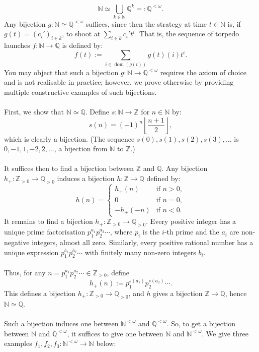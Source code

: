 \documentclass[11pt, a4paper, oneside]{article}
\theoremstyle{remark}
\theoremstyle{lemma}
\begin{document}
\[
\mathbb{N} \simeq \bigcup_{k \in \mathbb{N}} \mathbb{Q}^k =: \mathbb{Q}^{<\omega}.
\]
Any bijection \(g: \mathbb{N} \simeq \mathbb{Q}^{<\omega}\) suffices, since then the strategy at time \(t \in \mathbb{N}\) is, if \(g(t) = (c_i')_{i \in k}\), to shoot at \(\sum_{i \in k} c_i' t^{i}\). That is, the sequence of torpedo launches \(f: \mathbb{N} \rightarrow \mathbb{Q}\) is defined by:
\[
f(t) := \sum_{i \in \operatorname{dom}(g(t))} g(t)(i) t^{i}.
\]
You may object that such a bijection \(g: \mathbb{N} \rightarrow \mathbb{Q}^{<\omega}\) requires the axiom of choice and is not realisable in practice; however, we prove otherwise by providing multiple constructive examples of such bijections.
\\\\
First, we show that \(\mathbb{N} \simeq \mathbb{Q}\). Define \(s: \mathbb{N} \to \mathbb{Z}\) for \(n \in \mathbb{N}\) by:
\[
s(n) = (-1)^n \left\lfloor \frac{n + 1}{2} \right\rfloor,
\]
which is clearly a bijection. (The sequence \(s(0), s(1), s(2), s(3), \ldots\) is \(0, -1, 1, -2, 2, \ldots\), a bijection from \(\mathbb{N}\) to \(\mathbb{Z}\).)
\\\\
It suffices then to find a bijection between \(\mathbb{Z}\) and \(\mathbb{Q}\). Any bijection \(h_+: \mathbb{Z}_{>0} \to \mathbb{Q}_{>0}\) induces a bijection \(h: \mathbb{Z} \to \mathbb{Q}\) defined by:
\[
h(n) =
\begin{cases}
h_+(n) & \text{if } n > 0, \\
0 & \text{if } n = 0, \\
-h_+(-n) & \text{if } n < 0.
\end{cases}
\]
It remains to find a bijection \(h_+: \mathbb{Z}_{>0} \to \mathbb{Q}_{>0}\). Every positive integer has a unique prime factorisation \(p_1^{a_1} p_2^{a_2} \cdots\), where \(p_i\) is the \(i\)-th prime and the \(a_i\) are non-negative integers, almost all zero. Similarly, every positive rational number has a unique expression \(p_1^{b_1} p_2^{b_2} \cdots\) with finitely many non-zero integers \(b_i\).
\\\\
Thus, for any \(n = p_1^{a_1} p_2^{a_2} \cdots \in \mathbb{Z}_{>0}\), define
\[
h_+(n) := p_1^{s(a_1)} p_2^{s(a_2)} \cdots.
\]
This defines a bijection \(h_+: \mathbb{Z}_{>0} \to \mathbb{Q}_{>0}\), and \(h\) gives a bijection \(\mathbb{Z} \to \mathbb{Q}\), hence \(\mathbb{N} \simeq \mathbb{Q}\).
\\\\
Such a bijection induces one between \(\mathbb{N}^{<\omega}\) and \(\mathbb{Q}^{<\omega}\). So, to get a bijection between \(\mathbb{N}\) and \(\mathbb{Q}^{<\omega}\), it suffices to give one between \(\mathbb{N}\) and \(\mathbb{N}^{<\omega}\). We give three examples \(f_1, f_2, f_3: \mathbb{N}^{<\omega} \rightarrow \mathbb{N}\) below:
\end{document}
